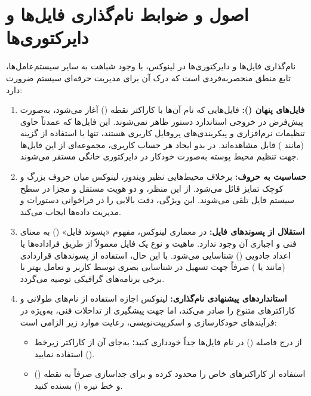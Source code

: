 \section{اصول و ضوابط نام‌گذاری فایل‌ها و دایرکتوری‌ها}

نام‌گذاری فایل‌ها و دایرکتوری‌ها در لینوکس، با وجود شباهت به سایر سیستم‌عامل‌ها، تابع منطق منحصربه‌فردی است که درک آن برای مدیریت حرفه‌ای سیستم ضرورت دارد:

\begin{enumerate}
  \item \textbf{فایل‌های پنهان ():} فایل‌هایی که نام آن‌ها با کاراکتر نقطه () آغاز می‌شود، به‌صورت پیش‌فرض در خروجی استاندارد دستور  ظاهر نمی‌شوند. این فایل‌ها که عمدتاً حاوی تنظیمات نرم‌افزاری و پیکربندی‌های پروفایل کاربری هستند، تنها با استفاده از گزینه  (مانند ) قابل مشاهده‌اند. در بدو ایجاد هر حساب کاربری، مجموعه‌ای از این فایل‌ها جهت تنظیم محیط پوسته به‌صورت خودکار در دایرکتوری خانگی مستقر می‌شوند.

  \item \textbf{حساسیت به حروف:} برخلاف محیط‌هایی نظیر ویندوز، لینوکس میان حروف بزرگ و کوچک تمایز قائل می‌شود. از این منظر،  و  دو هویت مستقل و مجزا در سطح سیستم فایل تلقی می‌شوند. این ویژگی، دقت بالایی را در فراخوانی دستورات و مدیریت داده‌ها ایجاب می‌کند.

  \item \textbf{استقلال از پسوندهای فایل:} در معماری لینوکس، مفهوم «پسوند فایل» () به معنای فنی و اجباری آن وجود ندارد. ماهیت و نوع یک فایل معمولاً از طریق فراداده‌ها یا اعداد جادویی () شناسایی می‌شود. با این حال، استفاده از پسوندهای قراردادی (مانند  یا ) صرفاً جهت تسهیل در شناسایی بصری توسط کاربر و تعامل بهتر با برخی برنامه‌های گرافیکی توصیه می‌گردد.

  \item \textbf{استانداردهای پیشنهادی نام‌گذاری:} لینوکس اجازه استفاده از نام‌های طولانی و کاراکترهای متنوع را صادر می‌کند، اما جهت پیشگیری از تداخلات فنی، به‌ویژه در فرآیندهای خودکارسازی و اسکریپت‌نویسی، رعایت موارد زیر الزامی است:
  \begin{itemize}
    \item از درج فاصله () در نام فایل‌ها جداً خودداری کنید؛ به‌جای آن از کاراکتر زیرخط (\cmd{\_}) استفاده نمایید.
    \item استفاده از کاراکترهای خاص را محدود کرده و برای جداسازی صرفاً به نقطه () و خط تیره (\cmd{-}) بسنده کنید.
  \end{itemize}
\end{enumerate}

